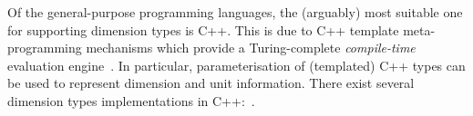 \documentclass[11pt,a4paper]{article}
\begin{document}
Of the general-purpose programming languages, the (arguably) most suitable one
for supporting dimension types is C++. This is due to C++ template
meta-programming mechanisms which provide a Turing-complete
\textit{compile-time} evaluation engine~\cite{C++Turing}. In particular,
parameterisation of (templated) C++ types can be used to represent dimension and
unit information. There exist several dimension types implementations in
C++:~\cite{SIunits}.






\end{document}
